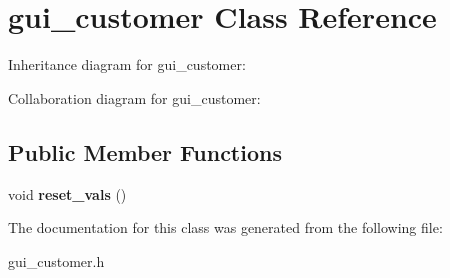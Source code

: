 \hypertarget{classgui__customer}{}\section{gui\+\_\+customer Class Reference}
\label{classgui__customer}


Inheritance diagram for gui\+\_\+customer\+:


Collaboration diagram for gui\+\_\+customer\+:
\subsection*{Public Member Functions}
\begin{DoxyCompactItemize}
\item 
void {\bfseries reset\+\_\+vals} ()\hypertarget{classgui__customer_ad9fc308d991dfdad30969c00467b973e}{}\label{classgui__customer_ad9fc308d991dfdad30969c00467b973e}

\end{DoxyCompactItemize}


The documentation for this class was generated from the following file\+:\begin{DoxyCompactItemize}
\item 
gui\+\_\+customer.\+h\end{DoxyCompactItemize}
